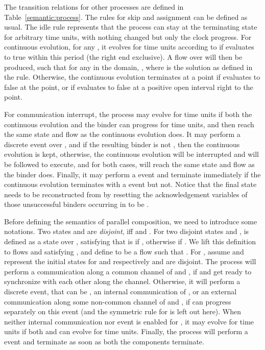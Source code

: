\documentclass{llncs}
\begin{document}
The transition relations for other processes are defined in Table~\ref{semantic:process}. The rules
for skip and assignment can be defined as usual. The idle rule represents that
the process can stay at the terminating state  for arbitrary 
time units, with nothing changed but only the clock progress.
 For continuous evolution, for any ,
it evolves for  time units according to 
if  evaluates to true within this period (the right end exclusive).
A flow    over  will then be produced, such that
 for any  in the domain,
 , where
  is the solution as defined in the rule.
 Otherwise, the continuous evolution
terminates at a point if  evaluates to false at the point, or if  evaluates to false
 at a positive open interval right to the point.


For communication interrupt, the process may evolve for  time units if both the continuous evolution and
the binder can progress for  time units, and then reach the same state and flow as the continuous evolution does.
It may perform a discrete event over , and if the resulting binder  is not
, then the continuous evolution is kept, otherwise,
the continuous evolution will be interrupted and  will be followed to execute, and for both cases,
will reach the same state and flow as the binder does.
Finally, it may perform a  event and terminate immediately
 if the continuous evolution terminates with a  event but  not.
Notice that  the final state  needs to be reconstructed from 
 by resetting the acknowledgement variables of those unsuccessful  binders occurring in 
 to be .

Before defining the semantics of  parallel composition, we need to introduce some notations.
Two states 
and  are \emph{disjoint}, iff  and . For two disjoint states 
and ,   is defined as a state over
, satisfying that
 is   if  , otherwise
  if  .
We lift this definition to flows  and  satisfying
, and define  to be a flow such that
.
For , assume  and    represent the initial states for
 and  respectively and are disjoint.
The process  will perform a communication along a common channel of  and , if
 and  get ready to synchronize with each other along the channel.
Otherwise, it will
perform a discrete event, that can be , an internal
communication of , or an external communication along some non-common channel of  and ,
if   can progress separately
on this event (and the symmetric rule for  is left out here). When
neither internal communication nor  event is enabled for , it
may evolve for  time units if both  and  can evolve for  time units. Finally,
 the process will perform a  event and terminate as soon as
both the components terminate.
\end{document}
